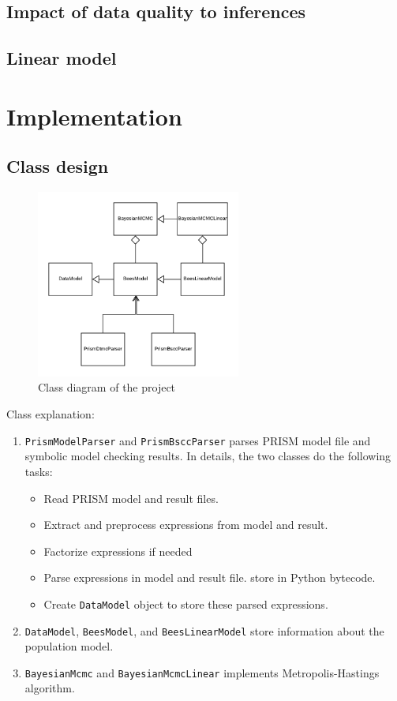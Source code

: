 \documentclass[12pt]{article}
\theoremstyle{definition}
\begin{document}
\subsection{Impact of data quality to inferences}

\subsection{Linear model}


\section{Implementation}
\subsection{Class design}
\begin{figure}[H]
  \centering
  \includegraphics[width=0.6\textwidth,keepaspectratio]{figures/class_diagram.png}
  \caption{Class diagram of the project}
\end{figure}
Class explanation:
\begin{enumerate}
\item \texttt{PrismModelParser} and \texttt{PrismBsccParser} parses PRISM model
  file and symbolic model checking results. In details, the two classes do the
  following tasks:
  \begin{itemize}
  \item Read PRISM model and result files.
  \item Extract and preprocess expressions from model and result.
  \item Factorize expressions if needed
  \item Parse expressions in model and result file. store in Python bytecode.
  \item Create \texttt{DataModel} object to store these parsed expressions.
  \end{itemize}
\item \texttt{DataModel}, \texttt{BeesModel}, and \texttt{BeesLinearModel} store
  information about the population model.
\item \texttt{BayesianMcmc} and \texttt{BayesianMcmcLinear} implements
  Metropolis-Hastings algorithm.
\end{enumerate}
\end{document}
